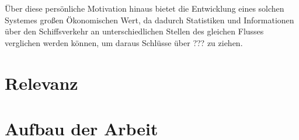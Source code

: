 \"Uber diese persönliche Motivation hinaus bietet die Entwicklung eines solchen Systemes gro\ss{}en \"Okonomischen Wert, da dadurch Statistiken und Informationen über den Schiffsverkehr an unterschiedlichen Stellen des gleichen Flusses verglichen werden können, um daraus Schlüsse über ??? zu ziehen.

\section{Relevanz}
\section{Aufbau der Arbeit}
